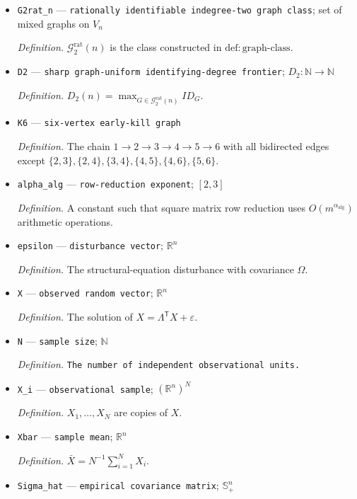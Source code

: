 \documentclass{article}
\begin{document}
\begin{itemize}
  \item \texttt{G2rat\_\allowbreak{}n} --- \texttt{rationally identifiable indegree-\allowbreak{}two graph class}; set of mixed graphs on \(V_n\)
  \par\smallskip\noindent\emph{Definition.} \(\mathcal G_{2}^{\mathrm{rat}}(n)\) is the class constructed in \(\mathrm{def:graph\mbox{-}class}\).
  \item \texttt{D2} --- \texttt{sharp graph-\allowbreak{}uniform identifying-\allowbreak{}degree frontier}; \(D_2:\mathbb N\to\mathbb N\)
  \par\smallskip\noindent\emph{Definition.} \(D_2(n)=\max_{G\in\mathcal G_{2}^{\mathrm{rat}}(n)}ID_G\).
  \item \texttt{K6} --- \texttt{six-\allowbreak{}vertex early-\allowbreak{}kill graph}
  \par\smallskip\noindent\emph{Definition.} The chain \(1\to2\to3\to4\to5\to6\) with all bidirected edges except \(\{2,3\},\{2,4\},\{3,4\},\{4,5\},\{4,6\},\{5,6\}\).
  \item \texttt{alpha\_\allowbreak{}alg} --- \texttt{row-\allowbreak{}reduction exponent}; \([2,3]\)
  \par\smallskip\noindent\emph{Definition.} A constant such that square matrix row reduction uses \(O(m^{\alpha_{\mathrm{alg}}})\) arithmetic operations.
  \item \texttt{epsilon} --- \texttt{disturbance vector}; \(\mathbb R^n\)
  \par\smallskip\noindent\emph{Definition.} The structural-equation disturbance with covariance \(\Omega\).
  \item \texttt{X} --- \texttt{observed random vector}; \(\mathbb R^n\)
  \par\smallskip\noindent\emph{Definition.} The solution of \(X=\Lambda^{\mathsf T}X+\varepsilon\).
  \item \texttt{N} --- \texttt{sample size}; \(\mathbb N\)
  \par\smallskip\noindent\emph{Definition.} \texttt{The number of independent observational units.}
  \item \texttt{X\_\allowbreak{}i} --- \texttt{observational sample}; \((\mathbb R^n)^N\)
  \par\smallskip\noindent\emph{Definition.} \(X_1,\ldots,X_N\) are copies of \(X\).
  \item \texttt{Xbar} --- \texttt{sample mean}; \(\mathbb R^n\)
  \par\smallskip\noindent\emph{Definition.} \(\bar X=N^{-1}\sum_{i=1}^N X_i\).
  \item \texttt{Sigma\_\allowbreak{}hat} --- \texttt{empirical covariance matrix}; \(\mathbb S_+^n\)

\end{itemize}
\end{document}

